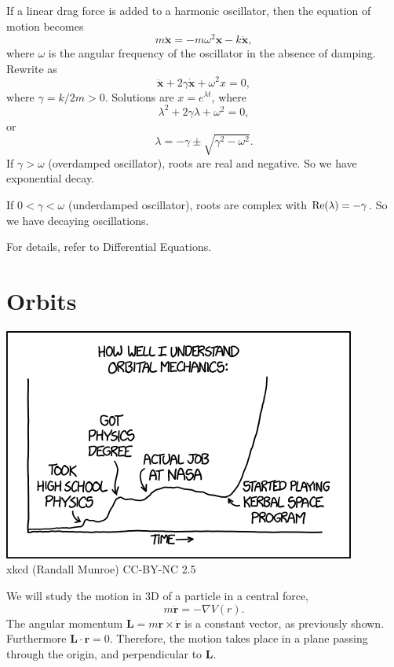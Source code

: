 \documentclass[a4paper]{article}
\begin{document}
\begin{eg}
  If a linear drag force is added to a harmonic oscillator, then the equation of motion becomes
  \[
    m\ddot{\mathbf{x}} = -m\omega^2 \mathbf{x} - k\dot{\mathbf{x}},
  \]
  where $\omega$ is the angular frequency of the oscillator in the absence of damping. Rewrite as
  \[
    \ddot{\mathbf{x}} + 2\gamma \dot{\mathbf{x}} + \omega^2 x = 0,
  \]
  where $\gamma = k/2m > 0$. Solutions are $x = e^{\lambda t}$, where
  \[
    \lambda^2 + 2\gamma \lambda + \omega^2 = 0,
  \]
  or
  \[
    \lambda = -\gamma \pm \sqrt{\gamma^2 - \omega^2}.
  \]
  If $\gamma > \omega$ (overdamped oscillator), roots are real and negative. So we have exponential decay.

  If $0 < \gamma < \omega$ (underdamped oscillator), roots are complex with $\operatorname{Re}(\lambda) = -\gamma$. So we have decaying oscillations.

  For details, refer to Differential Equations.
\end{eg}

\section{Orbits}
\begin{center}
  \includegraphics[scale=.75]{images/xkcd_orbital_mechanics.png}\\
  xkcd (Randall Munroe) CC-BY-NC 2.5
\end{center}
We will study the motion in 3D of a particle in a central force,
\[
  m\ddot{\mathbf{r}} = -\nabla V(r).
\]
The angular momentum $\mathbf{L} = m\mathbf{r}\times \dot{\mathbf{r}}$ is a constant vector, as previously shown. Furthermore $\mathbf{L}\cdot \mathbf{r} = 0$. Therefore, the motion takes place in a plane passing through the origin, and perpendicular to $\mathbf{L}$.
\end{document}
